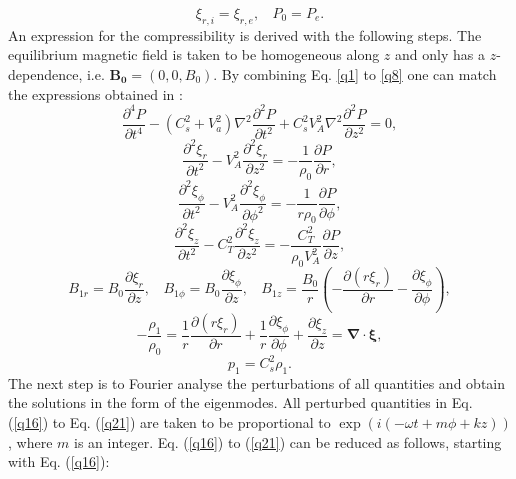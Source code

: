 \documentclass[12pt,a4paper,twoside]{article}
\begin{document}
\begin{equation}\label{n12}
\xi_{r,i} = \xi_{r,e}, \ \ \ \ P_{0} = P_e .
\end{equation}
An expression for the compressibility is derived with the following steps. The equilibrium magnetic field is taken to be homogeneous along $z$ and only has a $z$-dependence, i.e. $\boldsymbol{B_0} = (0,0,B_0)$. By combining Eq. \eqref{q1} to \eqref{q8} one can match the expressions obtained in \cite{Ruderman2009}:
\begin{equation} \label{q16}
\frac{\partial^4 P}{\partial t^4} - (C^2_s + V^2_a ) \nabla^2 \frac{\partial^2 P}{\partial t^2} + C^2_s V^2_A \nabla ^2 \frac{\partial^2 P}{\partial z^2} = 0 ,
\end{equation}
\begin{equation}\label{q17}
\frac{ \partial^2 \xi_r }{\partial t^2} - V^2_A  \frac{\partial^2 \xi_r}{\partial z^2}  = - \frac{1}{\rho_0} \frac{\partial P}{\partial r} ,
\end{equation}
\begin{equation}\label{q22}
\frac{ \partial^2 \xi_{\phi} }{\partial t^2} - V^2_A  \frac{\partial^2 \xi_{\phi} }{\partial \phi^2}  = - \frac{1}{r\rho_0} \frac{\partial P}{\partial \phi }  ,
\end{equation}
\begin{equation}\label{q18}
\frac{ \partial^2 \xi_{z} }{\partial t^2} - C^2_T  \frac{\partial^2 \xi_z }{\partial z^2}    = - \frac{C^2_T}{ \rho_0 V^2_A} \frac{\partial P}{\partial z } , 
\end{equation}
\begin{equation} \label{q19}
B_{1r} = B_0 \frac{\partial \xi_r}{\partial z}, \ \ \ \ B_{1\phi} = B_0  \frac{\partial \xi_{\phi}}{\partial z}, \ \ \ \ B_{1z} = \frac{B_0}{r} \left( -\frac{\partial (r \xi_r)}{\partial r} - \frac{\partial \xi_{\phi} }{\partial \phi} \right) ,
\end{equation}
\begin{equation}\label{q20}
- \frac{\rho_1}{\rho_0} = \frac{1}{r} \frac{\partial (r \xi_r)}{ \partial r} + \frac{1}{r} \frac{\partial \xi_{\phi}}{\partial \phi} + \frac{\partial \xi_z}{\partial z}  = \boldsymbol{\nabla} \cdot \boldsymbol{\xi},
\end{equation}
\begin{equation}\label{q21}
p_1 = C^2_s \rho_1 .
\end{equation}
The next step is to Fourier analyse the perturbations of all quantities and obtain the solutions in the form of the eigenmodes. All perturbed quantities in Eq. (\ref{q16}) to Eq. (\ref{q21}) are taken to be proportional to $\exp (i(-\omega t+m \phi +kz))$, where $m$ is an integer. Eq. (\ref{q16}) to (\ref{q21}) can be reduced as follows, starting with Eq. (\ref{q16}): 
\end{document}
